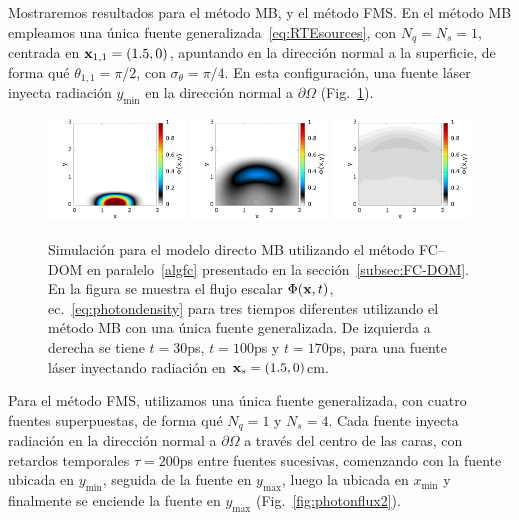 Mostraremos resultados para el método MB, y el método FMS. 
En el método MB empleamos una única fuente generalizada~\eqref{eq:RTEsources}, 
con $N_q=N_s=1$, centrada en $\mathbf{x}_{1,1}=(1.5,0)$, apuntando en la dirección 
normal a la superficie, de forma qué $\theta_{1,1}=\pi/2$, con $\sigma_{\theta}=\pi/4$. 
En esta configuración, una fuente láser inyecta radiación $y_{\text{min}}$ en la dirección 
normal a $\partial \Omega$ (Fig.~\ref{fig:photonflux}).
\begin{figure}[h!]
\centering
  \includegraphics[width=0.325\textwidth]{figuras/sim_t30.png}
  \includegraphics[width=0.325\textwidth]{figuras/sim_t100.png}
  \includegraphics[width=0.325\textwidth]{figuras/sim_t170.png}
  \caption{Simulación para el modelo directo MB utilizando 
  el método FC--DOM en paralelo~\ref{algfc} presentado en 
  la sección~\ref{subsec:FC-DOM}. En la figura se muestra el 
  flujo escalar $\Phi(\mathbf{x},t)$, ec.~\eqref{eq:photondensity} para tres tiempos 
  diferentes utilizando el método MB con una única fuente generalizada. De 
  izquierda a derecha se tiene $t=30$ps, 
$t=100$ps y $t=170$ps, para una fuente láser 
inyectando radiación en  $\mathbf{x}_s=(1.5,0)$cm.}
 \label{fig:photonflux}
\end{figure}
 
Para el método FMS, utilizamos una única fuente generalizada, con cuatro 
fuentes superpuestas, de forma qué $N_q=1$ y $N_s=4$. Cada fuente inyecta 
radiación en la dirección normal a $\partial \Omega$ a través del 
centro de las caras, con retardos temporales $\tau=200$ps entre fuentes sucesivas, 
comenzando con la fuente ubicada en $y_{\text{min}}$, seguida de la fuente 
en $y_{\text{max}}$, luego la ubicada en $x_{\text{min}}$ y finalmente 
se enciende la fuente en $y_{\text{max}}$ (Fig.~\ref{fig:photonflux2}).   
 

